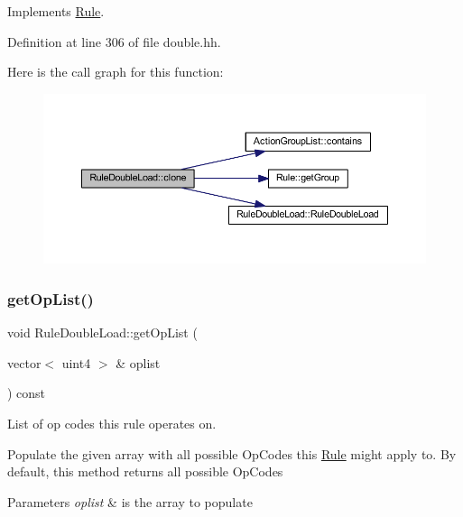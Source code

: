 Implements \mbox{\hyperlink{class_rule_a70de90a76461bfa7ea0b575ce3c11e4d}{Rule}}.



Definition at line 306 of file double.\+hh.

Here is the call graph for this function\+:
\nopagebreak
\begin{figure}[H]
\begin{center}
\leavevmode
\includegraphics[width=350pt]{class_rule_double_load_ac2d2342f59e7a6813b83457fe14ca386_cgraph}
\end{center}
\end{figure}
\mbox{\label{class_rule_double_load_a7869e2b5bec620dbd86cefd34829b4f1}} 
\subsubsection{\texorpdfstring{getOpList()}{getOpList()}}
{\footnotesize\ttfamily void Rule\+Double\+Load\+::get\+Op\+List (\begin{DoxyParamCaption}\item[{vector$<$ uint4 $>$ \&}]{oplist }\end{DoxyParamCaption}) const\hspace{0.3cm}{\ttfamily [virtual]}}



List of op codes this rule operates on. 

Populate the given array with all possible Op\+Codes this \mbox{\hyperlink{class_rule}{Rule}} might apply to. By default, this method returns all possible Op\+Codes 
\begin{DoxyParams}{Parameters}
{\em oplist} & is the array to populate \\
\hline
\end{DoxyParams}



